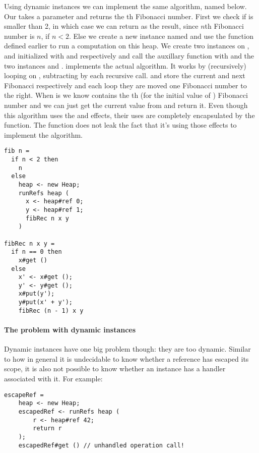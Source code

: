 Using dynamic instances we can implement the same algorithm, named  below.
Our  takes a parameter  and returns the th Fibonacci number.
First we check if  is smaller than 2, in which case we can return  as the result, since $n$th Fibonacci number is $n$, if $n < 2$.
Else we create a new  instance named  and use the  function defined earlier to run a computation on this heap.
We create two  instances on ,  and  initialized with  and  respectively and call the auxillary function  with  and the two instances  and .
 implements the actual algorithm.
It works by (recursively) looping on , subtracting by  each recursive call.
 and  store the current and next Fibonacci respectively and each loop they are moved one Fibonacci number to the right.
When  is  we know  contains the th (for the initial value of ) Fibonacci number and we can just get the current value from  and return it.
Even though this algorithm uses the  and  effects, their uses are completely encapsulated by the  function.
The  function does not leak the fact that it's using those effects to implement the algorithm.

\begin{verbatim}
fib n =
  if n < 2 then
    n
  else
    heap <- new Heap;
    runRefs heap (
      x <- heap#ref 0;
      y <- heap#ref 1;
      fibRec n x y
    )

fibRec n x y =
  if n == 0 then
    x#get ()
  else
    x' <- x#get ();
    y' <- y#get ();
    x#put(y');
    y#put(x' + y');
    fibRec (n - 1) x y
\end{verbatim}

\paragraph{The problem with dynamic instances}
\label{par:dyninstproblem}
Dynamic instances have one big problem though: they are too dynamic. Similar to how in general it is undecidable to know whether a reference has escaped its scope, it is also not possible to know whether an instance has a handler associated with it. 
For example:
\begin{verbatim}
escapeRef =
	heap <- new Heap;
	escapedRef <- runRefs heap (
		r <- heap#ref 42;
		return r
	);
	escapedRef#get () // unhandled operation call!
\end{verbatim}

